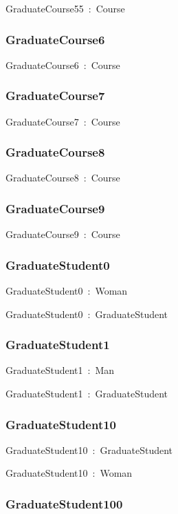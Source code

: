 \documentclass{article}
\begin{document}
GraduateCourse55~:~Course

\subsubsection*{GraduateCourse6}

GraduateCourse6~:~Course

\subsubsection*{GraduateCourse7}

GraduateCourse7~:~Course

\subsubsection*{GraduateCourse8}

GraduateCourse8~:~Course

\subsubsection*{GraduateCourse9}

GraduateCourse9~:~Course

\subsubsection*{GraduateStudent0}

GraduateStudent0~:~Woman

GraduateStudent0~:~GraduateStudent

\subsubsection*{GraduateStudent1}

GraduateStudent1~:~Man

GraduateStudent1~:~GraduateStudent

\subsubsection*{GraduateStudent10}

GraduateStudent10~:~GraduateStudent

GraduateStudent10~:~Woman

\subsubsection*{GraduateStudent100}
\end{document}
